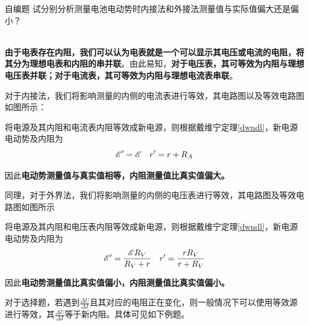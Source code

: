 \begin{ep}{自编题}{}
试分别分析测量电池电动势时内接法和外接法测量值与实际值偏大还是偏小？

~\\
\textbf{由于电表存在内阻，我们可以认为电表就是一个可以显示其电压或电流的电阻，将其分为理想电表和内阻的串并联}。由此易知，\textbf{对于电压表，其可等效为内阻与理想电压表并联；对于电流表，其可等效为内阻与理想电流表串联}。

对于内接法，我们将影响测量的内侧的电流表进行等效，其电路图以及等效电路图如图所示：



将电源及其内阻和电流表内阻等效成新电源，则根据戴维宁定理\eqref{dwndl}，新电源电动势及内阻为
$$ \mathscr{E}^{\prime} = \mathscr{E} \quad r^{\prime} = r + R_A $$

因此\textbf{电动势测量值与真实值相等，内阻测量值比真实值偏大。}

同理，对于外界法，我们将影响测量的内侧的电压表进行等效，其电路图及等效电路图如图所示



将电源及其内阻和电压表内阻等效成新电源，则根据戴维宁定理\eqref{dwndl}，新电源电动势及内阻为
$$ \mathscr{E}^{\prime} = \frac{ \mathscr{E} R_V}{R_V + r} \quad r^{\prime} = \frac{r R_V}{r + R_V} $$

因此\textbf{电动势测量值比真实值偏小，内阻测量值比真实值偏小。}
\end{ep}

对于选择题，若遇到$\frac{\Delta U}{\Delta I}$且其对应的电阻正在变化，则一般情况下可以使用等效源进行等效，其$\frac{\Delta U}{\Delta I}$等于新内阻。具体可见如下例题。

